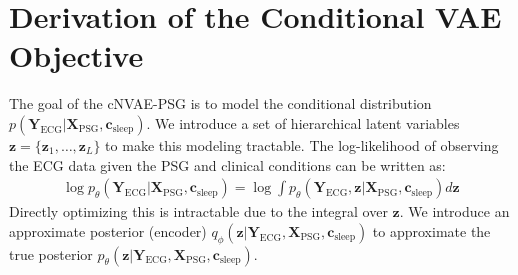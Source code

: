 \documentclass[10pt, conference]{IEEEtran}
\begin{document}
\printbibliography[heading=bibintoc, title=\ebibname]

\appendix
\addappheadtotoc

\section{Derivation of the Conditional VAE Objective}
\label{app:elbo_derivation}

The goal of the cNVAE-PSG is to model the conditional distribution $p(\mathbf{Y}_{\text{ECG}} | \mathbf{X}_{\text{PSG}}, \mathbf{c}_{\text{sleep}})$. We introduce a set of hierarchical latent variables $\mathbf{z} = \{\mathbf{z}_1, \dots, \mathbf{z}_L\}$ to make this modeling tractable. The log-likelihood of observing the ECG data given the PSG and clinical conditions can be written as:
\begin{align}
\log p_\theta(\mathbf{Y}_{\text{ECG}} | \mathbf{X}_{\text{PSG}}, \mathbf{c}_{\text{sleep}}) = \log \int p_\theta(\mathbf{Y}_{\text{ECG}}, \mathbf{z} | \mathbf{X}_{\text{PSG}}, \mathbf{c}_{\text{sleep}}) d\mathbf{z}
\end{align}
Directly optimizing this is intractable due to the integral over $\mathbf{z}$. We introduce an approximate posterior (encoder) $q_\phi(\mathbf{z} | \mathbf{Y}_{\text{ECG}}, \mathbf{X}_{\text{PSG}}, \mathbf{c}_{\text{sleep}})$ to approximate the true posterior $p_\theta(\mathbf{z} | \mathbf{Y}_{\text{ECG}}, \mathbf{X}_{\text{PSG}}, \mathbf{c}_{\text{sleep}})$.
\end{document}
